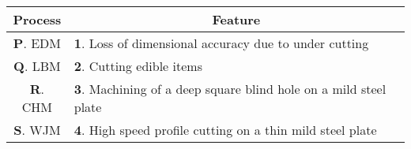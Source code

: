 \begin{center}
\begin{tabular}{|c|l|}
\hline
\multicolumn{1}{|c|}{Process} & \multicolumn{1}{|c|}{Feature} \\
\hline
\textbf{P}. EDM  & \textbf{1}. Loss of dimensional accuracy due to under cutting \\
\hline
\textbf{Q}. LBM  & \textbf{2}. Cutting edible items \\
\hline
\textbf{R}. CHM  & \textbf{3}. Machining of a deep square blind hole on a mild steel plate \\
\hline
\textbf{S}. WJM  & \textbf{4}. High speed profile cutting on a thin mild steel plate \\
\hline
\end{tabular}
\end{center}
